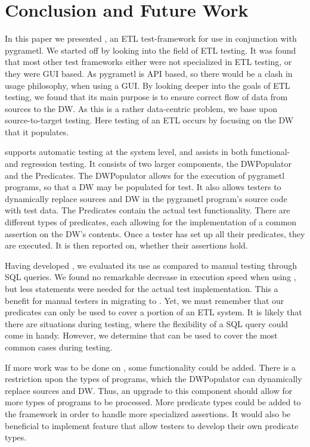 \section{Conclusion and Future Work}\label{sect:conc}

In this paper we presented \FW{}, an ETL test-framework for use in conjunction with pygrametl. We started off by looking into the field of ETL testing. It was found that most other test frameworks either were not specialized in ETL testing, or they were GUI based. As pygrametl is API based, so there would be a clash in usage philosophy, when using a GUI. By looking deeper into the goals of ETL testing, we found that its main purpose is to ensure correct flow of data from sources to the DW. As this is a rather data-centric problem, we base \FW{} upon source-to-target testing. Here testing of an ETL occurs by focusing on the DW that it populates. 

\FW{} supports automatic testing at the system level, and assists in both functional- and regression testing. It consists of two larger components, the DWPopulator and the Predicates. The DWPopulator allows for the execution of pygrametl programs, so that a DW may be populated for test. It also allows testers to dynamically replace sources and DW in the pygrametl program’s source code with test data. The Predicates contain the actual test functionality. There are different types of predicates, each allowing for the implementation of a common assertion on the DW’s contents. Once a tester has set up all their predicates, they are executed. It is then reported on, whether their assertions hold. 

Having developed \FW{}, we evaluated its use as compared to manual testing through SQL queries. We found no remarkable decrease in execution speed when using \FW{}, but less statements were needed for the actual test implementation. This a benefit for manual testers in migrating to \FW{}. Yet, we must remember that our predicates can only be used to cover a portion of an ETL system. It is likely that there are situations during testing, where the flexibility of a SQL query could come in handy. However, we determine that \FW{} can be used to cover the most common cases during testing.

If more work was to be done on \FW{}, some functionality could be added. There is a restriction upon the types of programs,  which the DWPopulator can dynamically replace sources and DW. Thus, an upgrade to this component should allow for more types of programs to be processed. More predicate types could be added to the framework in order to handle more specialized assertions. It would also be beneficial to implement feature that allow testers to develop their own predicate types. 



